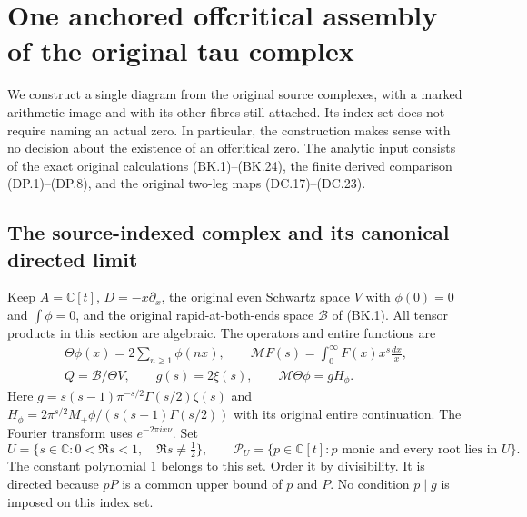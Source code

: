 \section{One anchored offcritical assembly of the original tau complex}
\label{sec:coherent-offcritical-assembly}

We construct a single diagram from the original source complexes, with a
marked arithmetic image and with its other fibres still attached.  Its
index set does not require naming an actual zero.  In particular, the
construction makes sense with no decision about the existence of an
offcritical zero.  The analytic input consists of the exact original
calculations (BK.1)--(BK.24), the finite derived comparison (DP.1)--(DP.8),
and the original two-leg maps (DC.17)--(DC.23).

\subsection{The source-indexed complex and its canonical directed limit}

Keep $A=\mathbb C[t]$, $D=-x\partial_x$, the original even Schwartz
space $V$ with $\phi(0)=0$ and $\int\phi=0$, and the original
rapid-at-both-ends space $\mathscr B$ of (BK.1).  All tensor products
in this section are algebraic.  The operators and entire functions are
\[
 \begin{gathered}
 \Theta\phi(x)=2\sum_{n\ge1}\phi(nx),\qquad
 \mathcal MF(s)=\int_0^\infty F(x)x^s\frac{dx}{x},\\
 Q=\mathscr B/\Theta V,
 \qquad g(s)=2\xi(s),\qquad \mathcal M\Theta\phi=gH_\phi.
 \end{gathered}
                                                               \tag{CAU.1}
\]
Here $g=s(s-1)\pi^{-s/2}\Gamma(s/2)\zeta(s)$ and
$H_\phi=2\pi^{s/2}M_+\phi/(s(s-1)\Gamma(s/2))$ with its original
entire continuation.  The Fourier transform uses $e^{-2\pi ix\nu}$.
Set
\[
 U=\{s\in\mathbb C:0<\Re s<1,\quad\Re s\ne\tfrac12\},
 \qquad
 \mathcal P_U=\{p\in\mathbb C[t]:p\text{ monic and every root lies in }U\}.
                                                               \tag{CAU.2}
\]
The constant polynomial $1$ belongs to this set.  Order it by divisibility.
It is directed because $pP$ is a common upper bound of $p$ and $P$.
No condition $p\mid g$ is imposed on this index set.

